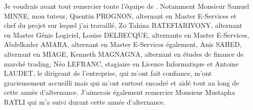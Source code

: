 \documentclass[12pt,oneside,noprintercorrection]{iut}
\begin{document}
\MakeThesisTitlePage






\begin{ThesisAcknowledgments}
Je voudrais avant tout remercier toute l'équipe de \glaz{}. Notamment Monsieur Samuel MINNE, mon tuteur, Quentin PROGNON, alternant en Master E-Services et chef du projet sur lequel j'ai travaillé,  Zo Tahina RATEFIARIVONY, alternant en Master Génie Logiciel, Louise DELBECQUE, alternante en Master E-Services, Abdelkader AMARA, alternant en Master E-Services également, Anis SAHED, alternant en MIAGE, Kenneth MAGNAGNA, alternant en études de finance de marché trading, Néo LEFRANC, stagiaire en Licence Informatique et Antoine LAUDET, le dirigeant de l'entreprise, qui m'ont fait confiance, m'ont gracieusement accueilli mais qui m'ont surtout encadré et aidé tout au long de cette année d'alternance.
J'aimerais également remercier Monsieur Mustapha RATLI qui m'a suivi durant cette année d'alternance.
\end{ThesisAcknowledgments}






\WritePartLabelInToc \WriteChapterLabelInToc



\tableofcontents


\mainmatter
\end{document}

